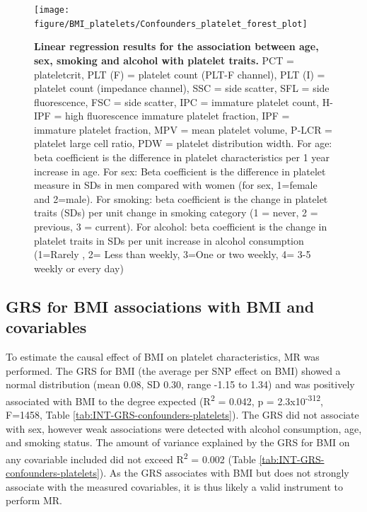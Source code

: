 \documentclass[11pt,twoside]{bristolthesis}
\begin{document}
\begin{figure}

{\centering \texttt{[image: figure/BMI\_platelets/Confounders\_platelet\_forest\_plot]} 

}

\caption[Linear regression results for the association between age, sex, smoking and alcohol with platelet traits]{\textbf{Linear regression results for the association between age, sex, smoking and alcohol with platelet traits.} PCT = plateletcrit, PLT (F) = platelet count (PLT-F channel), PLT (I) = platelet count (impedance channel), SSC = side scatter, SFL = side fluorescence, FSC = side scatter, IPC = immature platelet count, H-IPF = high fluorescence immature platelet fraction, IPF = immature platelet fraction, MPV = mean platelet volume, P-LCR = platelet large cell ratio, PDW = platelet distribution width. For age: beta coefficient is the difference in platelet characteristics per 1 year increase in age. For sex: Beta coefficient is the difference in platelet measure in SDs in men compared with women (for sex, 1=female and 2=male). For smoking: beta coefficient is the change in platelet traits (SDs) per unit change in smoking category (1 = never, 2 = previous, 3 = current). For alcohol: beta coefficient is the change in platelet traits in SDs per unit increase in alcohol consumption (1=Rarely , 2= Less than weekly, 3=One or two weekly, 4= 3-5 weekly or every day)}\label{fig:confounder-platelets}
\end{figure}
\hypertarget{grs-for-bmi-associations-with-bmi-and-covariables}{%
\subsection{GRS for BMI associations with BMI and covariables}\label{grs-for-bmi-associations-with-bmi-and-covariables}}

To estimate the causal effect of BMI on platelet characteristics, MR was performed. The GRS for BMI (the average per SNP effect on BMI) showed a normal distribution (mean 0.08, SD 0.30, range -1.15 to 1.34) and was positively associated with BMI to the degree expected (R\textsuperscript{2} = 0.042, p = 2.3x10\textsuperscript{-312}, F=1458, Table \ref{tab:INT-GRS-confounders-platelets}). The GRS did not associate with sex, however weak associations were detected with alcohol consumption, age, and smoking status. The amount of variance explained by the GRS for BMI on any covariable included did not exceed R\textsuperscript{2} = 0.002 (Table \ref{tab:INT-GRS-confounders-platelets}). As the GRS associates with BMI but does not strongly associate with the measured covariables, it is thus likely a valid instrument to perform MR.
\end{document}
